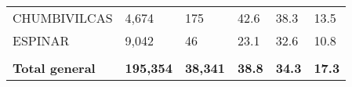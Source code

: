 \begin{tabular}{llllll}
	\cellcolor[HTML]{F8CBAD}CHUMBIVILCAS                           & 4,674                                                                 & 175                                                              & 42.6                                                                             & 38.3                                                                        & 13.5                                                                                \\
	\cellcolor[HTML]{F8CBAD}ESPINAR                                & 9,042                                                                 & 46                                                               & 23.1                                                                             & 32.6                                                                        & 10.8                                                                                \\
	&                                                                       &                                                                  &                                                                                  &                                                                             &                                                                                     \\
	\rowcolor[HTML]{DDEBF7} 
	\textbf{Total   general}                                       & \textbf{195,354}                                                      & \textbf{38,341}                                                  & \textbf{38.8}                                                                    & \textbf{34.3}                                                               & \textbf{17.3}                                                                      
\end{tabular}